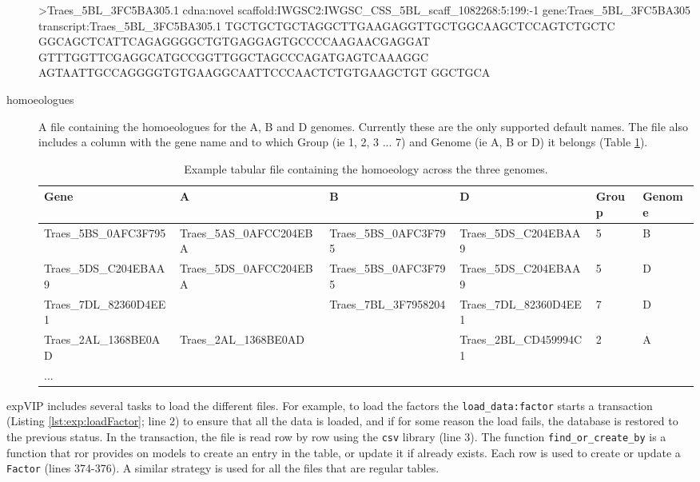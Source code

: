 \begin{description}
\begin{code}[label=lst:poly:geneFa, caption={[Gene set fasta file] A fasta entry on of the gene set.}]
>Traes_5BL_3FC5BA305.1 cdna:novel scaffold:IWGSC2:IWGSC_CSS_5BL_scaff_1082268:5:199:-1 gene:Traes_5BL_3FC5BA305 transcript:Traes_5BL_3FC5BA305.1
TGCTGCTGCTAGGCTTGAAGAGGTTGCTGGCAAGCTCCAGTCTGCTC
GGCAGCTCATTCAGAGGGGCTGTGAGGAGTGCCCCAAGAACGAGGAT
GTTTGGTTCGAGGCATGCCGGTTGGCTAGCCCAGATGAGTCAAAGGC
AGTAATTGCCAGGGGTGTGAAGGCAATTCCCAACTCTGTGAAGCTGT
GGCTGCA
\end{code}
\item[homoeologues] A file containing the homoeologues for the  A, B and D genomes. Currently these are the only supported default names. The file also includes a column with the gene name and to which Group (ie 1, 2, 3 ... 7) and Genome (ie A, B or D) it belongs (Table \ref{tab:exp:hom}).  

\begin{table}
\centering
\caption[Homoeology file]{Example tabular file containing the homoeology across the three genomes. }
\label{tab:exp:hom}
\begin{tabular}{llllll}
\toprule
Gene & A & B & D & Group & Genome \\
\midrule
Traes\_5BS\_0AFC3F795 & Traes\_5AS\_0AFCC204EBA & Traes\_5BS\_0AFC3F795 & Traes\_5DS\_C204EBAA9 & 5 & B \\
Traes\_5DS\_C204EBAA9 & Traes\_5DS\_0AFCC204EBA & Traes\_5BS\_0AFC3F795 & Traes\_5DS\_C204EBAA9 & 5 & D \\
Traes\_7DL\_82360D4EE1 & & Traes\_7BL\_3F7958204 & Traes\_7DL\_82360D4EE1 &  7 & D \\
Traes\_2AL\_1368BE0AD & Traes\_2AL\_1368BE0AD & & Traes\_2BL\_CD459994C1 & 2 & A \\
... & & & & &  \\
\bottomrule 
\end{tabular}
\end{table}
\end{description} 

expVIP includes several tasks to load the different files. 
For example, to load the factors the \verb|load_data:factor| starts a transaction (Listing \ref{lst:exp:loadFactor}; line 2) to ensure that all the data is loaded, and if for some reason the load fails, the database is restored to the previous status.
In the transaction, the file is read row by row using the \verb|csv| library (line 3).
The function \verb|find_or_create_by| is a function that \acrshort{ror} provides on models to create an entry in the table, or update it if already exists.
Each row is used to create or update a \verb|Factor| (lines 374-376). 
A similar strategy is used for all the files that are regular tables. 

